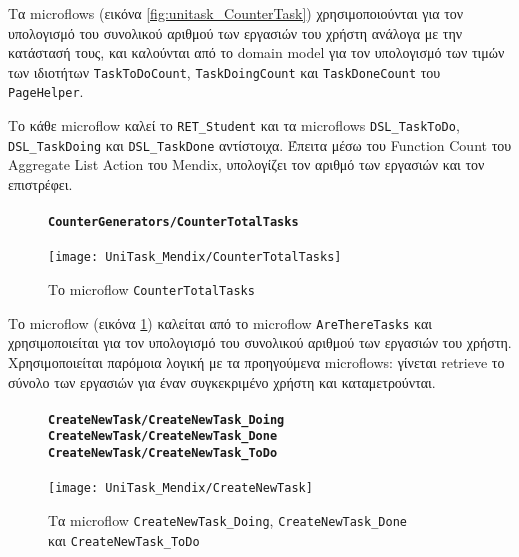                 Τα microflows (εικόνα \ref{fig:unitask_CounterTask}) χρησιμοποιούνται για τον υπολογισμό του συνολικού αριθμού των εργασιών του χρήστη ανάλογα με την κατάστασή τους, και καλούνται από το domain model για τον υπολογισμό των τιμών των ιδιοτήτων \texttt{TaskToDoCount}, \texttt{TaskDoingCount} και \texttt{TaskDoneCount} του \texttt{PageHelper}.

                Το κάθε microflow καλεί το \texttt{RET\_Student} και τα microflows \texttt{DSL\_TaskToDo}, \texttt{DSL\_TaskDoing} και \texttt{DSL\_TaskDone} αντίστοιχα. Έπειτα μέσω του Function Count του Aggregate List Action του Mendix, υπολογίζει τον αριθμό των εργασιών και τον επιστρέφει.

                \newpage

                \begin{figure}[H] \noindent
                    \paragraph{\texttt{CounterGenerators/CounterTotalTasks}}
                    \begin{center}
                        \texttt{[image: UniTask\_Mendix/CounterTotalTasks]}
                        \caption{\centering Το microflow \texttt{CounterTotalTasks}}
                        \label{fig:unitask_CounterTotalTasks}
                    \end{center}
                \end{figure}

                Το microflow (εικόνα \ref{fig:unitask_CounterTotalTasks}) καλείται από το microflow \texttt{AreThereTasks} και χρησιμοποιείται για τον υπολογισμό του συνολικού αριθμού των εργασιών του χρήστη. Χρησιμοποιείται παρόμοια λογική με τα προηγούμενα microflows: γίνεται retrieve το σύνολο των εργασιών για έναν συγκεκριμένο χρήστη και καταμετρούνται.

                \begin{figure}[H] \noindent
                    \paragraph{\texttt{CreateNewTask/CreateNewTask\_Doing} \\ \texttt{CreateNewTask/CreateNewTask\_Done} \\ \texttt{CreateNewTask/CreateNewTask\_ToDo}}
                    \begin{center}
                        \texttt{[image: UniTask\_Mendix/CreateNewTask]}
                        \caption{\centering Τα microflow \texttt{CreateNewTask\_Doing}, \texttt{CreateNewTask\_Done} \\ και \texttt{CreateNewTask\_ToDo}}
                        \label{fig:unitask_CreateNewTask}
                    \end{center}
                \end{figure}

